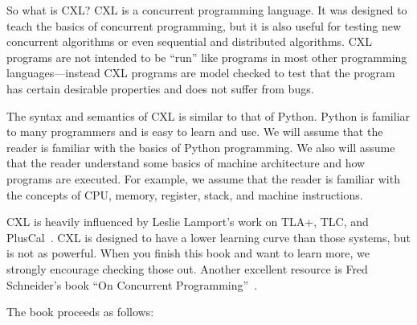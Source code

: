 \documentclass{report}
\begin{document}
So what is CXL?
CXL is a concurrent programming language.  It was designed to teach
the basics of concurrent programming, but it is also useful for
testing new concurrent algorithms or even sequential and distributed
algorithms.  CXL programs are not intended to be ``run'' like programs
in most other programming languages---instead CXL programs are
model checked to test that the program has certain desirable
properties and does not suffer from bugs.

The syntax and semantics of CXL is similar to that of Python.
Python is familiar to many programmers and is easy to learn and
use.  We will assume that the reader is familiar with the basics
of Python programming.  We also will assume that the reader
understand some basics of machine architecture and how programs
are executed.  For example, we assume that the reader is familiar
with the concepts of CPU, memory, register, stack, and machine
instructions.

CXL is heavily influenced by Leslie Lamport's work on
TLA+, TLC, and PlusCal~\cite{Lamport02, Lamport09}.
CXL is designed to have a lower learning curve than those
systems, but is not as powerful.  When you finish this book
and want to learn more, we strongly encourage checking
those out.
Another excellent resource is Fred Schneider's book ``On
Concurrent Programming''~\cite{Schneider97}.

The book proceeds as follows:
\end{document}
